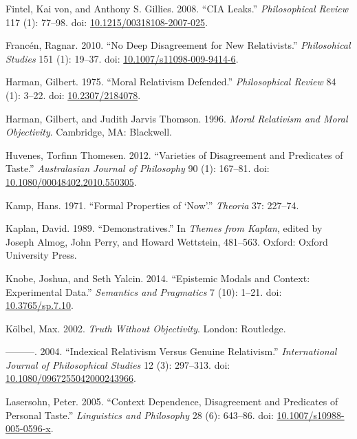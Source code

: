 \documentclass[
  11pt,
  letterpaper,
  DIV=11,
  numbers=noendperiod,
  twoside]{scrartcl}
\newlength{\cslhangindent}
\newenvironment{CSLReferences}[2] %
 {\begin{list}{}{%
  \setlength{\itemindent}{0pt}
  \setlength{\leftmargin}{0pt}
  \setlength{\parsep}{0pt}
  \ifodd #1
   \setlength{\leftmargin}{\cslhangindent}
   \setlength{\itemindent}{-1\cslhangindent}
  \fi
  \setlength{\itemsep}{#2\baselineskip}}}
 {\end{list}}
\begin{document}
\begin{CSLReferences}{1}{0}
Fintel, Kai von, and Anthony S. Gillies. 2008. {``CIA Leaks.''}
\emph{Philosophical Review} 117 (1): 77--98. doi:
\href{https://doi.org/10.1215/00318108-2007-025}{10.1215/00318108-2007-025}.

Francén, Ragnar. 2010. {``No Deep Disagreement for New Relativists.''}
\emph{Philosohical Studies} 151 (1): 19--37. doi:
\href{https://doi.org/10.1007/s11098-009-9414-6}{10.1007/s11098-009-9414-6}.

Harman, Gilbert. 1975. {``Moral Relativism Defended.''}
\emph{Philosophical Review} 84 (1): 3--22. doi:
\href{https://doi.org/10.2307/2184078}{10.2307/2184078}.

Harman, Gilbert, and Judith Jarvis Thomson. 1996. \emph{Moral Relativism
and Moral Objectivity}. Cambridge, MA: Blackwell.

Huvenes, Torfinn Thomesen. 2012. {``Varieties of Disagreement and
Predicates of Taste.''} \emph{Australasian Journal of Philosophy} 90
(1): 167--81. doi:
\href{https://doi.org/10.1080/00048402.2010.550305}{10.1080/00048402.2010.550305}.

Kamp, Hans. 1971. {``Formal Properties of {`Now'}.''} \emph{Theoria} 37:
227--74.

Kaplan, David. 1989. {``Demonstratives.''} In \emph{Themes from Kaplan},
edited by Joseph Almog, John Perry, and Howard Wettstein, 481--563.
Oxford: Oxford University Press.

Knobe, Joshua, and Seth Yalcin. 2014. {``Epistemic Modals and Context:
Experimental Data.''} \emph{Semantics and Pragmatics} 7 (10): 1--21.
doi: \href{https://doi.org/10.3765/sp.7.10}{10.3765/sp.7.10}.

Kölbel, Max. 2002. \emph{Truth Without Objectivity}. London: Routledge.

---------. 2004. {``Indexical Relativism Versus Genuine Relativism.''}
\emph{International Journal of Philosophical Studies} 12 (3): 297--313.
doi:
\href{https://doi.org/10.1080/0967255042000243966}{10.1080/0967255042000243966}.

Lasersohn, Peter. 2005. {``Context Dependence, Disagreement and
Predicates of Personal Taste.''} \emph{Linguistics and Philosophy} 28
(6): 643--86. doi:
\href{https://doi.org/10.1007/s10988-005-0596-x}{10.1007/s10988-005-0596-x}.


\end{CSLReferences}
\end{document}
